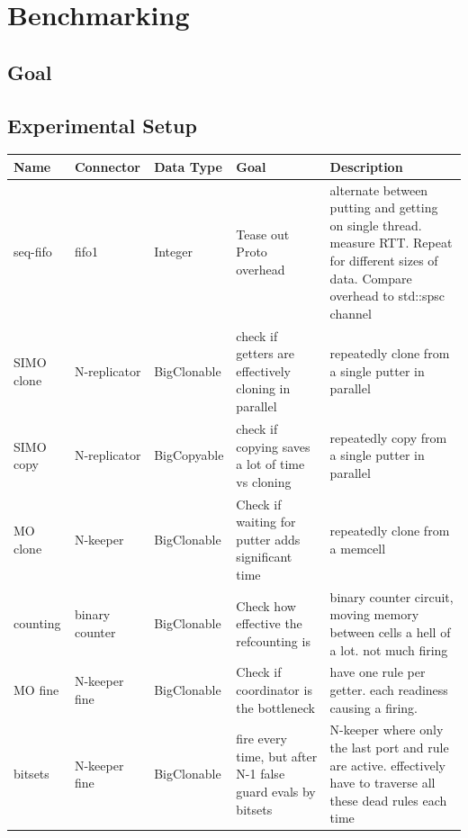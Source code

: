 \chapter{Benchmarking}
\label{sec:benchmarking}

\section{Goal}
\section{Experimental Setup}

\begin{landscape}
\begin{table}[p!]
\begin{adjustbox}{width=19cm}
\begin{tabular}{l|ll|p{46mm}p{67mm}}
\rowcolor{gray!26}
Name & Connector & Data Type & Goal & Description \\

\hline
seq-fifo & fifo1 & Integer & Tease out Proto overhead & alternate between putting and getting on single thread. measure RTT. Repeat for different sizes of data. Compare overhead to std::spsc channel \\

SIMO clone & N-replicator & BigClonable & check if getters are effectively cloning in parallel & repeatedly clone from a single putter in parallel \\

SIMO copy & N-replicator & BigCopyable & check if copying saves a lot of time vs cloning & repeatedly copy from a single putter in parallel \\

MO clone & N-keeper & BigClonable & Check if waiting for putter adds significant time & repeatedly clone from a memcell \\

counting & binary counter & BigClonable & Check how effective the refcounting is & binary counter circuit, moving memory between cells a hell of a lot. not much firing \\

MO fine & N-keeper fine & BigClonable & Check if coordinator is the bottleneck & have one rule per getter. each readiness causing a firing. \\

bitsets & N-keeper fine & BigClonable & fire every time, but after N-1 false guard evals by bitsets & N-keeper where only the last port and rule are active. effectively have to traverse all these dead rules each time \\


\end{tabular}
\end{adjustbox}
\end{table}
\end{landscape}
